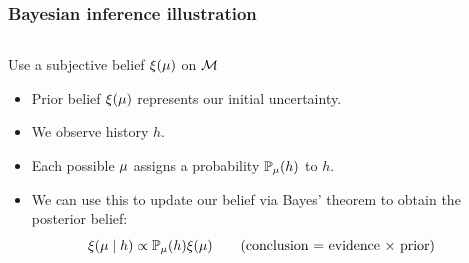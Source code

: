   \begin{frame}
    \frametitle{Bayesian inference illustration}
    \begin{columns}
      \begin{column}{0.7\textwidth}
        \begin{block}{Use a subjective belief $\xi(\mu)$ on ${\mathcal{M}}$}
          \begin{itemize}
          \item<1-> \alert{Prior} belief $\xi(\mu)$ represents our initial uncertainty.
          \item<2-> We \alert{observe history} $h$.
          \item<3->Each possible $\mu$ assigns a \alert{probability} $\mathop{\mbox{\ensuremath{\mathbb{P}}}}\nolimits_\mu(h)$ to $h$.
          \item<4-> We can use this to \alert{update} our belief via Bayes' theorem to obtain the \alert{posterior} belief:
            \[
            \xi(\mu \mid h) \propto \mathop{\mbox{\ensuremath{\mathbb{P}}}}\nolimits_\mu(h) \xi(\mu)
            \tag{conclusion = evidence $\times$ prior}
            \]
          \end{itemize}
        \end{block}
      \end{column}
      \begin{column}{0.3\textwidth}
        \centering
        \\
\end{column}
\end{columns}
\end{frame}
